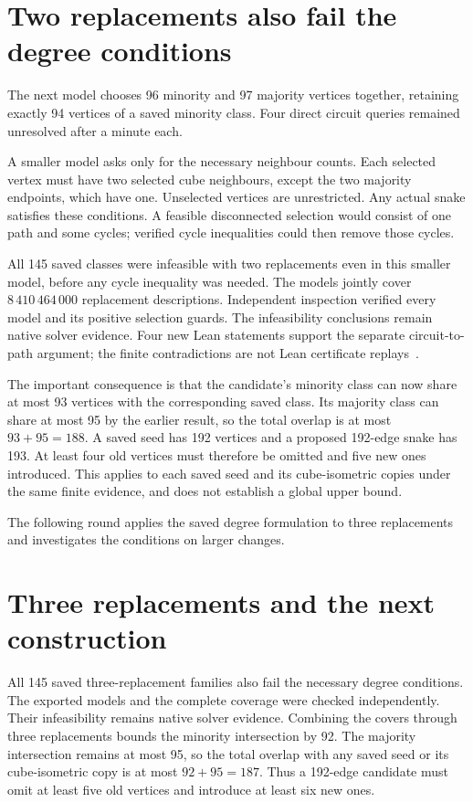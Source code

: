 \documentclass[11pt,a4paper]{article}
\begin{document}
\section{Two replacements also fail the degree conditions}
The next model chooses 96 minority and 97 majority vertices together,
retaining exactly 94 vertices of a saved minority class. Four direct
circuit queries remained unresolved after a minute each.

A smaller model asks only for the necessary neighbour counts. Each
selected vertex must have two selected cube neighbours, except the two
majority endpoints, which have one. Unselected vertices are unrestricted.
Any actual snake satisfies these conditions. A feasible disconnected
selection would consist of one path and some cycles; verified cycle
inequalities could then remove those cycles.

All 145 saved classes were infeasible with two replacements even in
this smaller model, before any cycle inequality was needed. The models
jointly cover $8\,410\,464\,000$ replacement descriptions. Independent
inspection verified every model and its positive selection guards.
The infeasibility conclusions remain native solver evidence. Four new
Lean statements support the separate circuit-to-path argument; the
finite contradictions are not Lean certificate replays~\cite{research235}.

The important consequence is that the candidate's minority class can
now share at most 93 vertices with the corresponding saved class.
Its majority class can share at most 95 by the earlier result, so the
total overlap is at most $93+95=188$. A saved seed has 192 vertices and
a proposed 192-edge snake has 193. At least four old vertices must
therefore be omitted and five new ones introduced. This applies to
each saved seed and its cube-isometric copies under the same finite
evidence, and does not establish a global upper bound.

The following round applies the saved degree formulation to three
replacements and investigates the conditions on larger changes.

\section{Three replacements and the next construction}
All 145 saved three-replacement families also fail the necessary degree
conditions. The exported models and the complete coverage were checked
independently. Their infeasibility remains native solver evidence.
Combining the covers through three replacements bounds the minority
intersection by 92. The majority intersection remains at most 95, so
the total overlap with any saved seed or its cube-isometric copy is at
most $92+95=187$. Thus a 192-edge candidate must omit at least five old
vertices and introduce at least six new ones.
\end{document}
